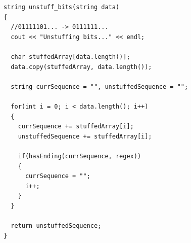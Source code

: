 \documentclass[12pt]{article}
\begin{document}
\begin{lstlisting}
string unstuff_bits(string data)
{
  //01111101... -> 0111111...
  cout << "Unstuffing bits..." << endl;
  
  char stuffedArray[data.length()];
  data.copy(stuffedArray, data.length());
  
  string currSequence = "", unstuffedSequence = "";
  
  for(int i = 0; i < data.length(); i++)
  {
    currSequence += stuffedArray[i];
    unstuffedSequence += stuffedArray[i];
    
    if(hasEnding(currSequence, regex))
    {
      currSequence = "";
      i++;
    }
  }
  
  return unstuffedSequence;
}
\end{lstlisting}
\end{document}
